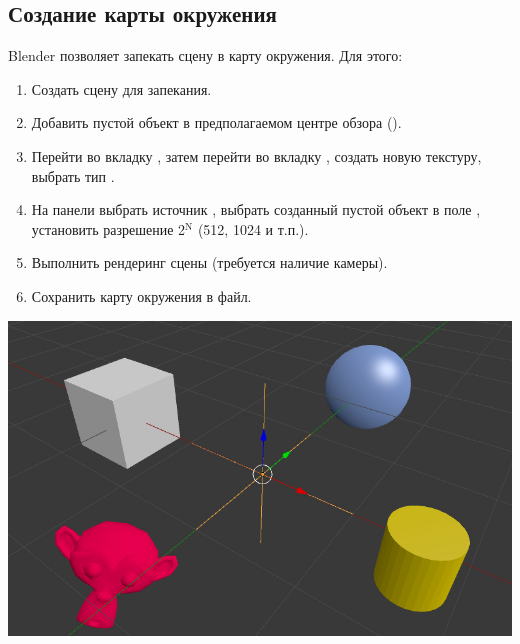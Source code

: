 \documentclass[a4paper,12pt,oneside]{sphinxmanual}
\begin{document}
\subsection{Создание карты окружения}
\label{textures:id18}
Blender позволяет запекать сцену в карту окружения. Для этого:
\begin{enumerate}
\item {} 
Создать сцену для запекания.

\item {} 
Добавить пустой объект в предполагаемом центре обзора ().

\item {} 
Перейти во вкладку , затем перейти во вкладку , создать новую текстуру, выбрать тип .

\item {} 
На панели  выбрать источник , выбрать созданный пустой объект в поле , установить разрешение 2$^{\text{N}}$ (512, 1024 и т.п.).

\item {} 
Выполнить рендеринг сцены  (требуется наличие камеры).

\item {} 
Сохранить карту окружения в файл.

\end{enumerate}

{\hfill\includegraphics[width=1.000\linewidth]{environment_map_baking_scene.jpg}\hfill}

\begin{DUlineblock}{0em}
\item[] 
\end{DUlineblock}
\end{document}
